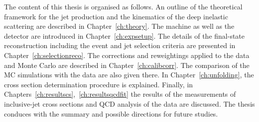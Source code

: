 The content of this thesis is organised as follows. An outline of the theoretical framework for the jet production and the kinematics of the deep inelastic scattering are described in Chapter~\ref{ch:theory}. The \hera machine as well as the \zeus detector are introduced in Chapter~\ref{ch:expsetup}. The details of the final-state reconstruction including the event and jet selection criteria are presented in Chapter~\ref{ch:selectionreco}. The corrections and reweightings applied to the data and Monte Carlo are described in Chapter~\ref{ch:calibcorr}. The comparison of the MC simulations with the data are also given there. In Chapter~\ref{ch:unfolding}, the cross section determination procedure is explained. Finally, in Chapters~\ref{ch:resultscs},~\ref{ch:resultsqcdfit} the results of the measurements of inclusive-jet cross sections and QCD analysis of the data are discussed. The thesis conduces with the summary and possible directions for future studies.